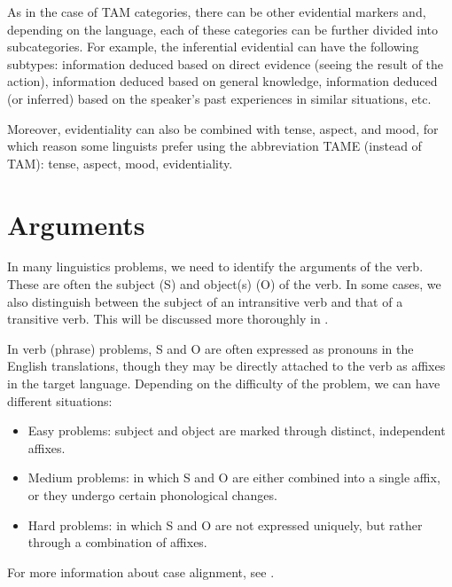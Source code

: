 \begin{refsection}
 As in the case of TAM categories, there can be other evidential markers and, depending on the language, each of these categories can be further divided into subcategories. For example, the inferential evidential can have the following subtypes: information deduced based on direct evidence (seeing the result of the action), information deduced based on general knowledge, information deduced (or inferred) based on the speaker's past experiences in similar situations, etc.

Moreover, evidentiality can also be combined with tense, aspect, and mood, for which reason some linguists prefer using the abbreviation TAME (instead of TAM): tense, aspect, mood, evidentiality.

\section{Arguments}

 In many linguistics problems, we need to identify the arguments of the verb. These are often the subject (S) and object(s) (O) of the verb. In some cases, we also distinguish between the subject of an intransitive verb and that of a transitive verb. This will be discussed more thoroughly in .

 In verb (phrase) problems, S and O are often expressed as pronouns in the English translations, though they may be directly attached to the verb as affixes in the target language. Depending on the difficulty of the problem, we can have different situations:

\begin{itemize}
    \item Easy problems: subject and object are marked through distinct, independent affixes.
    \item Medium problems: in which S and O are either combined into a single affix, or they undergo certain phonological changes.
    \item Hard problems: in which S and O are not expressed uniquely, but rather through a combination of affixes. 
\end{itemize}
For more information about case alignment, see .


\end{refsection}
